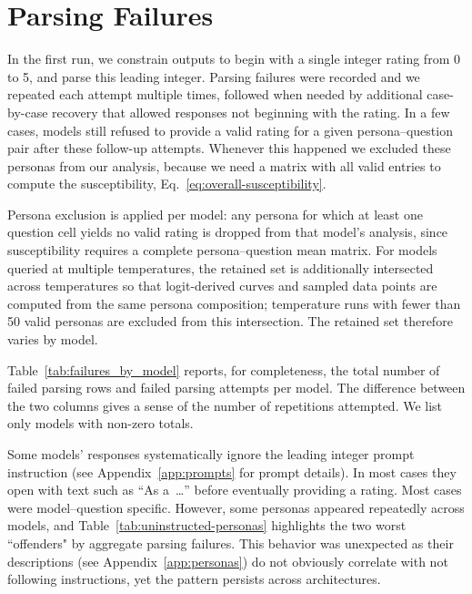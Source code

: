 \documentclass{article}
\begin{document}
\section{Parsing Failures}
\label{sec:failures}

In the first run, we constrain outputs to begin with a single integer rating from 0 to 5, and parse this leading integer. Parsing failures were recorded and we repeated each attempt multiple times, followed when needed by additional case-by-case recovery that allowed responses not beginning with the rating. In a few cases, models still refused to provide a valid rating for a given persona--question pair after these follow-up attempts. Whenever this happened we excluded these personas from our analysis, because we need a matrix with all valid entries to compute the susceptibility, Eq.~\eqref{eq:overall-susceptibility}.

Persona exclusion is applied per model: any persona for which at least one question cell yields no valid rating is dropped from that model's analysis, since susceptibility requires a complete persona--question mean matrix. For models queried at multiple temperatures, the retained set is additionally intersected across temperatures so that logit-derived curves and sampled data points are computed from the same persona composition; temperature runs with fewer than 50 valid personas are excluded from this intersection. The retained set therefore varies by model.

Table~\ref{tab:failures_by_model} reports, for completeness, the total number of failed parsing rows and failed parsing attempts per model. The difference between the two columns gives a sense of the number of repetitions attempted. We list only models with non-zero totals.



Some models' responses systematically ignore the leading integer prompt instruction (see Appendix~\ref{app:prompts} for prompt details). In most cases they open with text such as ``As a~\ldots'' before eventually providing a rating. Most cases were model--question specific. However, some personas appeared repeatedly across models, and Table~\ref{tab:uninstructed-personas} highlights the two worst ``offenders" by aggregate parsing failures. This behavior was unexpected as their descriptions (see Appendix~\ref{app:personas}) do not obviously correlate with not following instructions, yet the pattern persists across architectures.

\begin{table}[t!]
  \centering
  \caption{Personas with the highest parsing failure counts.}
  \label{tab:uninstructed-personas}
\end{table}
\end{document}
